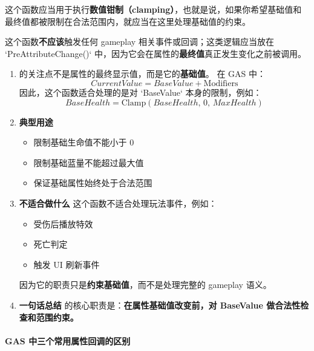 这个函数应当用于执行\textbf{数值钳制（clamping）}，也就是说，如果你希望基础值和最终值都被限制在合法范围内，就应当在这里处理基础值的约束。

这个函数\textbf{不应该}触发任何 gameplay 相关事件或回调；这类逻辑应当放在 `PreAttributeChange()` 中，因为它会在属性的\textbf{最终值}真正发生变化之前被调用。

\begin{enumerate}
	\item {} 的关注点不是属性的最终显示值，而是它的\textbf{基础值}。  
	在 GAS 中：
	\[
	CurrentValue = BaseValue + \text{Modifiers}
	\]
	因此，这个函数适合处理的是对 `BaseValue` 本身的限制，例如：
	\[
	BaseHealth = \mathrm{Clamp}(BaseHealth,\, 0,\, MaxHealth)
	\]
	
	\item \textbf{典型用途}
	\begin{itemize}
		\item 限制基础生命值不能小于 $0$
		\item 限制基础蓝量不能超过最大值
		\item 保证基础属性始终处于合法范围
	\end{itemize}
	
	\item \textbf{不适合做什么}
	这个函数不适合处理玩法事件，例如：
	\begin{itemize}
		\item 受伤后播放特效
		\item 死亡判定
		\item 触发 UI 刷新事件
	\end{itemize}
	因为它的职责只是\textbf{约束基础值}，而不是处理完整的 gameplay 语义。
	
	\item \textbf{一句话总结}
	 的核心职责是：\textbf{在属性基础值改变前，对 BaseValue 做合法性检查和范围约束。}
\end{enumerate}


\paragraph{GAS 中三个常用属性回调的区别}

